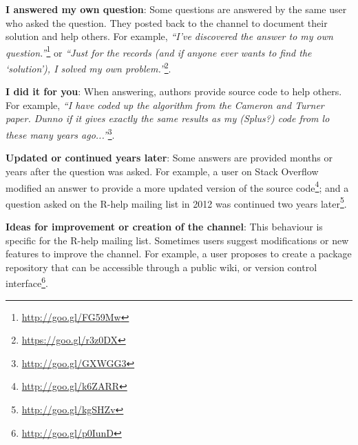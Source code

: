 \begin{packed_enum}
\item \textbf{I answered my own question}: Some questions are answered by the same user who asked the question. They posted back to the channel to document
  their solution and help others.
        For example, \textit{``I've discovered the answer to my own question.''}\footnote{\url{http://goo.gl/FG59Mw}} or \textit{``Just for the records (and if
          anyone ever wants to find the `solution'), I solved my own problem.''}\footnote{\url{https://goo.gl/r3z0DX}}. 
 
        \item \textbf{I did it for you}: When answering, authors provide source code to help others. For example, \textit{``I have coded up the algorithm from the Cameron and Turner paper. Dunno if it gives exactly the same results as my (Splus?) code from lo these many years ago...''}\footnote{\url{http://goo.gl/GXWGG3}}.

        \item \textbf{Updated or continued years later}: Some answers are provided months or years after the question was asked.
        For example, a user on Stack Overflow modified an answer to provide a more updated version of the source code\footnote{\url{http://goo.gl/k6ZARR}}; and a {question asked on the R-help mailing list in 2012 was continued two years later}\footnote{\url{http://goo.gl/kgSHZv}}.

        \item \textbf{Ideas for improvement or creation of the channel}: This behaviour is specific for the R-help mailing list. Sometimes users suggest modifications or new features to improve the channel. For example, a {user proposes to create a package repository that can be accessible through a public wiki, or version control interface}\footnote{\url{http://goo.gl/p0IunD}}.
    \end{packed_enum}


